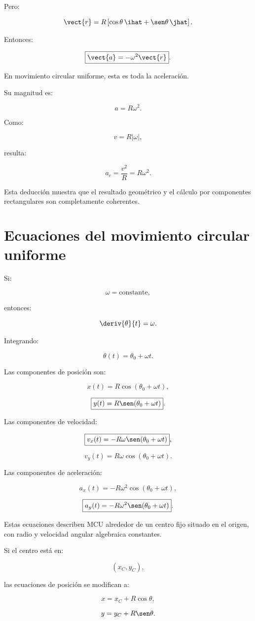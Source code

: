 Pero:

\[
\vect{r}
=
R
\left[
\cos\theta\,\ihat+\sen\theta\,\jhat
\right].
\]

Entonces:

\[
\boxed{
\vect{a}=-\omega^2\vect{r}
}.
\]

En movimiento circular uniforme, esta es toda la aceleración.

Su magnitud es:

\[
a
=
R\omega^2.
\]

Como:

\[
v=R|\omega|,
\]

resulta:

\[
\boxed{
a_c=\frac{v^2}{R}=R\omega^2
}.
\]

Esta deducción muestra que el resultado geométrico y el cálculo por
componentes rectangulares son completamente coherentes.


\section{Ecuaciones del movimiento circular uniforme}

Si:

\[
\omega=\text{constante},
\]

entonces:

\[
\deriv{\theta}{t}=\omega.
\]

Integrando:

\[
\boxed{
\theta(t)=\theta_0+\omega t
}.
\]

Las componentes de posición son:

\[
\boxed{
x(t)=R\cos(\theta_0+\omega t)
},
\]

\[
\boxed{
y(t)=R\sen(\theta_0+\omega t)
}.
\]

Las componentes de velocidad:

\[
\boxed{
v_x(t)=-R\omega\sen(\theta_0+\omega t)
},
\]

\[
\boxed{
v_y(t)=R\omega\cos(\theta_0+\omega t)
}.
\]

Las componentes de aceleración:

\[
\boxed{
a_x(t)=-R\omega^2\cos(\theta_0+\omega t)
},
\]

\[
\boxed{
a_y(t)=-R\omega^2\sen(\theta_0+\omega t)
}.
\]

\begin{condicion}

Estas ecuaciones describen MCU alrededor de un centro fijo situado en el
origen, con radio y velocidad angular algebraica constantes.

Si el centro está en:

\[
(x_C,y_C),
\]

las ecuaciones de posición se modifican a:

\[
x=x_C+R\cos\theta,
\]

\[
y=y_C+R\sen\theta.
\]

\end{condicion}


